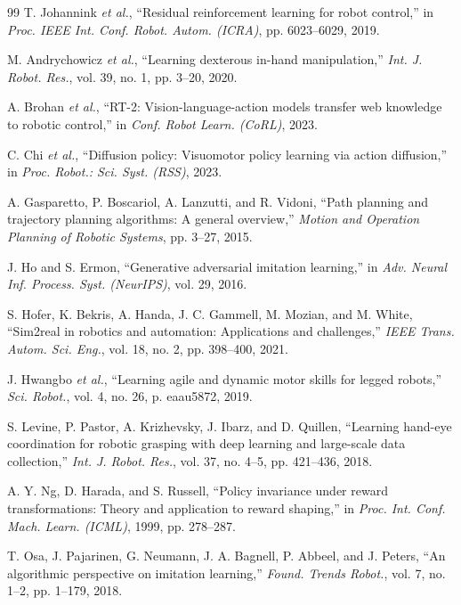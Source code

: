 \documentclass[journal,twocolumn]{IEEEtran}
\begin{document}
\begin{thebibliography}{99}
T. Johannink \textit{et al.}, ``Residual reinforcement learning for robot control,'' in \textit{Proc. IEEE Int. Conf. Robot. Autom. (ICRA)}, pp. 6023--6029, 2019.

M. Andrychowicz \textit{et al.}, ``Learning dexterous in-hand manipulation,'' \textit{Int. J. Robot. Res.}, vol. 39, no. 1, pp. 3--20, 2020.

A. Brohan \textit{et al.}, ``RT-2: Vision-language-action models transfer web knowledge to robotic control,'' in \textit{Conf. Robot Learn. (CoRL)}, 2023.

C. Chi \textit{et al.}, ``Diffusion policy: Visuomotor policy learning via action diffusion,'' in \textit{Proc. Robot.: Sci. Syst. (RSS)}, 2023.

A. Gasparetto, P. Boscariol, A. Lanzutti, and R. Vidoni, ``Path planning and trajectory planning algorithms: A general overview,'' \textit{Motion and Operation Planning of Robotic Systems}, pp. 3--27, 2015.

J. Ho and S. Ermon, ``Generative adversarial imitation learning,'' in \textit{Adv. Neural Inf. Process. Syst. (NeurIPS)}, vol. 29, 2016.

S. Hofer, K. Bekris, A. Handa, J. C. Gammell, M. Mozian, and M. White, ``Sim2real in robotics and automation: Applications and challenges,'' \textit{IEEE Trans. Autom. Sci. Eng.}, vol. 18, no. 2, pp. 398--400, 2021.

J. Hwangbo \textit{et al.}, ``Learning agile and dynamic motor skills for legged robots,'' \textit{Sci. Robot.}, vol. 4, no. 26, p. eaau5872, 2019.

S. Levine, P. Pastor, A. Krizhevsky, J. Ibarz, and D. Quillen, ``Learning hand-eye coordination for robotic grasping with deep learning and large-scale data collection,'' \textit{Int. J. Robot. Res.}, vol. 37, no. 4--5, pp. 421--436, 2018.

A. Y. Ng, D. Harada, and S. Russell, ``Policy invariance under reward transformations: Theory and application to reward shaping,'' in \textit{Proc. Int. Conf. Mach. Learn. (ICML)}, 1999, pp. 278--287.

T. Osa, J. Pajarinen, G. Neumann, J. A. Bagnell, P. Abbeel, and J. Peters, ``An algorithmic perspective on imitation learning,'' \textit{Found. Trends Robot.}, vol. 7, no. 1--2, pp. 1--179, 2018.


\end{thebibliography}
\end{document}
